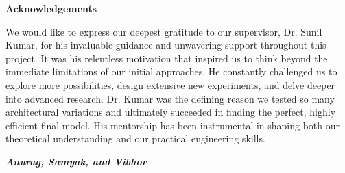 \begin{center}
{\LARGE \bf Acknowledgements}
\end{center}

\vspace{1cm}

We would like to express our deepest gratitude to our supervisor, Dr. Sunil Kumar, for his invaluable guidance and unwavering support throughout this project. It was his relentless motivation that inspired us to think beyond the immediate limitations of our initial approaches. He constantly challenged us to explore more possibilities, design extensive new experiments, and delve deeper into advanced research. Dr. Kumar was the defining reason we tested so many architectural variations and ultimately succeeded in finding the perfect, highly efficient final model. His mentorship has been instrumental in shaping both our theoretical understanding and our practical engineering skills.

\vspace{1cm}
\begin{flushright}
\textit{\textbf{Anurag, Samyak, and Vibhor}}
\end{flushright}
